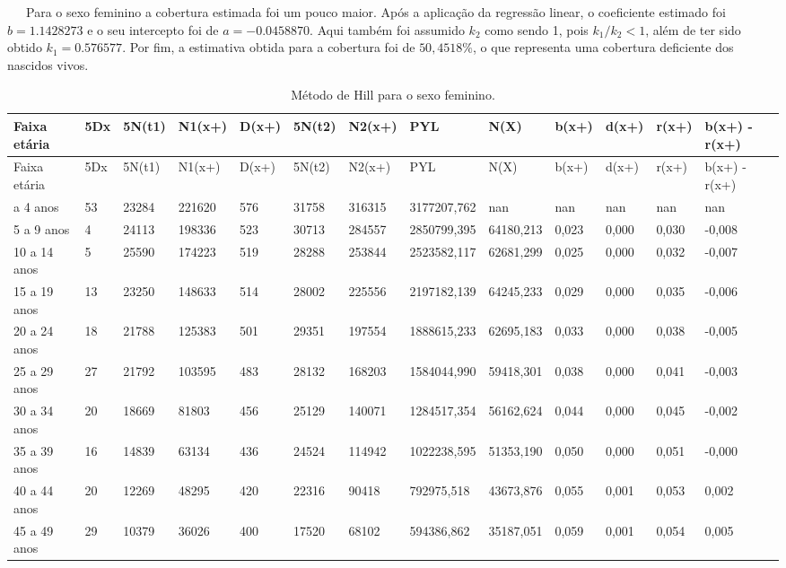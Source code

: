 \documentclass[
  12pt,
  a4paper,
]{scrreprt}
\begin{document}
~~~Para o sexo feminino a cobertura estimada foi um pouco maior. Após a
aplicação da regressão linear, o coeficiente estimado foi
\(b = 1.1428273\) e o seu intercepto foi de \(a = -0.0458870\). Aqui
também foi assumido \(k_{2}\) como sendo 1, pois \(k_{1} / k_{2} < 1\),
além de ter sido obtido \(k_{1} = 0.576577\). Por fim, a estimativa
obtida para a cobertura foi de \(50,4518\%\), o que representa uma
cobertura deficiente dos nascidos vivos.

\begin{longtable}[]{@{}lllllllllllll@{}}
\caption{Método de Hill para o sexo
feminino.}\label{T_fb7d7}\tabularnewline
\toprule\noalign{}
Faixa etária & 5Dx & 5N(t1) & N1(x+) & D(x+) & 5N(t2) & N2(x+) & PYL &
N(X) & b(x+) & d(x+) & r(x+) & b(x+) - r(x+) \\
\midrule\noalign{}
\endfirsthead
\toprule\noalign{}
Faixa etária & 5Dx & 5N(t1) & N1(x+) & D(x+) & 5N(t2) & N2(x+) & PYL &
N(X) & b(x+) & d(x+) & r(x+) & b(x+) - r(x+) \\
\midrule\noalign{}
\endhead
\bottomrule\noalign{}
\endlastfoot
0 a 4 anos & 53 & 23284 & 221620 & 576 & 31758 & 316315 & 3177207,762 &
nan & nan & nan & nan & nan \\
5 a 9 anos & 4 & 24113 & 198336 & 523 & 30713 & 284557 & 2850799,395 &
64180,213 & 0,023 & 0,000 & 0,030 & -0,008 \\
10 a 14 anos & 5 & 25590 & 174223 & 519 & 28288 & 253844 & 2523582,117 &
62681,299 & 0,025 & 0,000 & 0,032 & -0,007 \\
15 a 19 anos & 13 & 23250 & 148633 & 514 & 28002 & 225556 & 2197182,139
& 64245,233 & 0,029 & 0,000 & 0,035 & -0,006 \\
20 a 24 anos & 18 & 21788 & 125383 & 501 & 29351 & 197554 & 1888615,233
& 62695,183 & 0,033 & 0,000 & 0,038 & -0,005 \\
25 a 29 anos & 27 & 21792 & 103595 & 483 & 28132 & 168203 & 1584044,990
& 59418,301 & 0,038 & 0,000 & 0,041 & -0,003 \\
30 a 34 anos & 20 & 18669 & 81803 & 456 & 25129 & 140071 & 1284517,354 &
56162,624 & 0,044 & 0,000 & 0,045 & -0,002 \\
35 a 39 anos & 16 & 14839 & 63134 & 436 & 24524 & 114942 & 1022238,595 &
51353,190 & 0,050 & 0,000 & 0,051 & -0,000 \\
40 a 44 anos & 20 & 12269 & 48295 & 420 & 22316 & 90418 & 792975,518 &
43673,876 & 0,055 & 0,001 & 0,053 & 0,002 \\
45 a 49 anos & 29 & 10379 & 36026 & 400 & 17520 & 68102 & 594386,862 &
35187,051 & 0,059 & 0,001 & 0,054 & 0,005 \\

\end{longtable}
\end{document}
